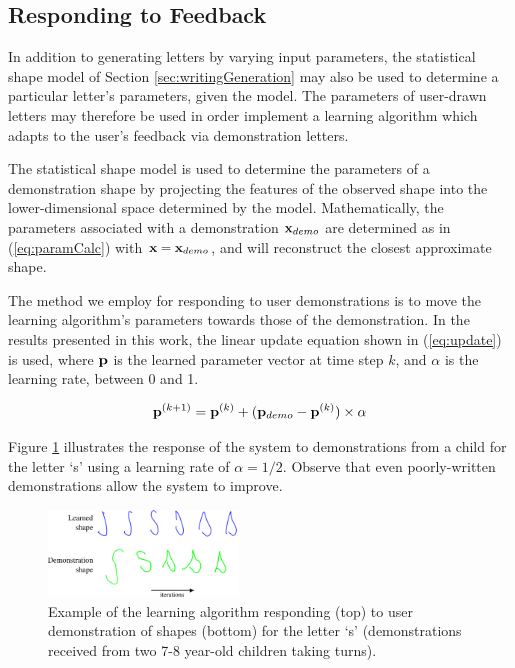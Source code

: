 \documentclass{sig-alternate}
\begin{document}
\subsection{Responding to Feedback}\label{sec:learningAlg}

In addition to generating letters by varying input parameters, the statistical
shape model of Section \ref{sec:writingGeneration} may also be used to determine
a particular letter's parameters, given the model. The parameters of user-drawn
letters may therefore be used in order implement a learning algorithm which
adapts to the user's feedback via demonstration letters.

The statistical shape model is used to determine the parameters of a
demonstration shape by projecting the features of the observed shape into the
lower-dimensional space determined by the model. Mathematically, the parameters
associated with a demonstration ${\bf x}_{demo}$ are determined as in
(\ref{eq:paramCalc}) with ${\bf x}={\bf x}_{demo}$, and will reconstruct the
closest approximate shape.

The method we employ for responding to user demonstrations is to move the
learning algorithm's parameters towards those of the demonstration. In the
results presented in this work, the linear update equation shown in
(\ref{eq:update}) is used, where ${\bf p}$ is the learned parameter vector at
time step $k$, and $\alpha$ is the learning rate, between 0 and 1.  

\begin{equation}\label{eq:update}
{\bf p}^{(k+1)} = {\bf p}^{(k)} + ({\bf p}_{demo}-{\bf
p}^{(k)})\times\alpha
\end{equation}

Figure \ref{fig:demonstrationShapes2} illustrates the response of the system to
demonstrations from a child for the letter `s' using a learning rate of
$\alpha=1/2$. Observe that even poorly-written demonstrations allow the system
to improve.

\begin{figure}[thpb]
    \centering
    \includegraphics[width=0.45\textwidth]{figures/learningSdemo}
    \caption{\label{fig:demonstrationShapes2}Example of the learning algorithm
    responding (top) to user demonstration of shapes (bottom) for the letter `s' (demonstrations received from two 7-8 year-old children taking turns).}
\end{figure}
\end{document}
